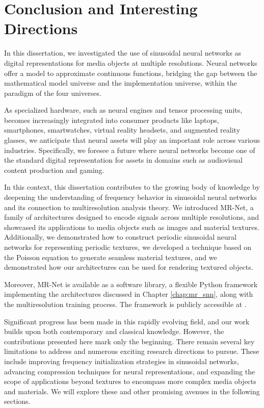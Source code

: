 \chapter{Conclusion and Interesting Directions}
\label{chap:future}

In this dissertation, we investigated the use of sinusoidal neural networks as digital representations for media objects at multiple resolutions. Neural networks offer a model to approximate continuous functions, bridging the gap between the mathematical model universe and the implementation universe, within the paradigm of the four universes. 

As specialized hardware, such as neural engines and tensor processing units, becomes increasingly integrated into consumer products like laptops, smartphones, smartwatches, virtual reality headsets, and augmented reality glasses, we anticipate that neural assets will play an important role across various industries. Specifically, we foresee a future where neural networks become one of the standard digital representation for assets in domains such as audiovisual content production and gaming.

In this context, this dissertation contributes to the growing body of knowledge by deepening the understanding of frequency behavior in sinusoidal neural networks and its connection to multiresolution analysis theory. We introduced MR-Net, a family of architectures designed to encode signals across multiple resolutions, and showcased its applications to media objects such as images and material textures. Additionally, we demonstrated how to construct periodic sinusoidal neural networks for representing periodic textures, we developed a technique based on the Poisson equation to generate seamless material textures, and we demonstrated how our architectures can be used for rendering textured objects.

Moreover, MR-Net is available as a software library, a flexible Python framework implementing the architectures discussed in Chapter \ref{chap:mr_snn}, along with the multiresolution training process. The framework is publicly accessible at \cite{mrnetGithub}.


Significant progress has been made in this rapidly evolving field, and our work builds upon both contemporary and classical knowledge. However, the contributions presented here mark only the beginning. There remain several key limitations to address and numerous exciting research directions to pursue. These include improving frequency initialization strategies in sinusoidal networks, advancing compression techniques for neural representations, and expanding the scope of applications beyond textures to encompass more complex media objects and materials. We will explore these and other promising avenues in the following sections.

